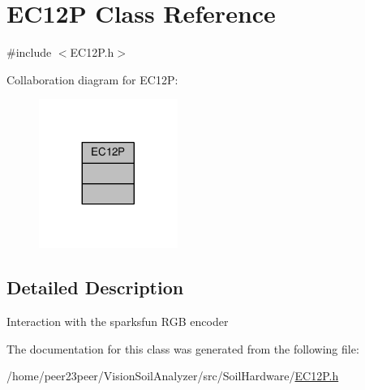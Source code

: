 \hypertarget{class_e_c12_p}{}\section{E\+C12\+P Class Reference}
\label{class_e_c12_p}


{\ttfamily \#include $<$E\+C12\+P.\+h$>$}



Collaboration diagram for E\+C12\+P\+:\nopagebreak
\begin{figure}[H]
\begin{center}
\leavevmode
\includegraphics[width=128pt]{class_e_c12_p__coll__graph}
\end{center}
\end{figure}


\subsection{Detailed Description}
Interaction with the sparksfun R\+G\+B encoder 

The documentation for this class was generated from the following file\+:\begin{DoxyCompactItemize}
\item 
/home/peer23peer/\+Vision\+Soil\+Analyzer/src/\+Soil\+Hardware/\hyperlink{_e_c12_p_8h}{E\+C12\+P.\+h}\end{DoxyCompactItemize}
